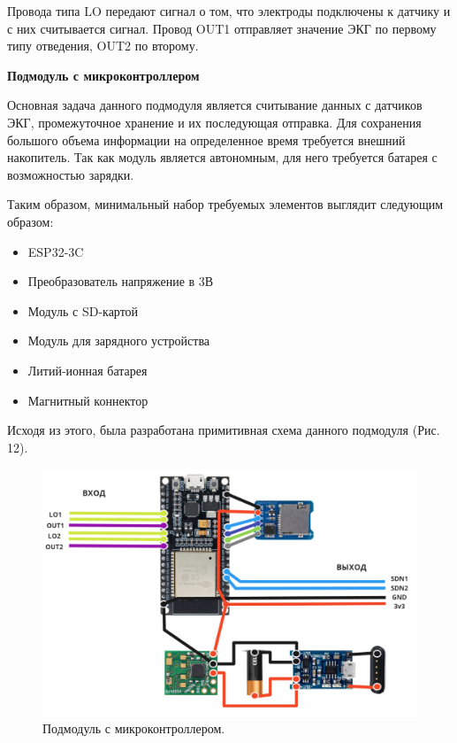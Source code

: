 \documentclass[12pt, russian]{extarticle}
\begin{document}
\begin{spacing}{1.5}
Провода типа LO передают сигнал о том, что электроды подключены к датчику и с них считывается сигнал. Провод OUT1 отправляет значение ЭКГ по первому типу отведения, OUT2 по второму.

\par\textbf{Подмодуль с микроконтроллером}

Основная задача данного подмодуля является считывание данных с датчиков ЭКГ, промежуточное хранение и их последующая отправка. Для сохранения большого объема информации на определенное время требуется внешний накопитель. Так как модуль является автономным, для него требуется батарея с возможностью зарядки.

Таким образом, минимальный набор требуемых элементов выглядит следующим образом:

\begin{itemize}
    \item ESP32-3C
    \item Преобразователь напряжение в 3В
    \item Модуль с SD-картой
    \item Модуль для зарядного устройства
    \item Литий-ионная батарея
    \item Магнитный коннектор
\end{itemize}

Исходя из этого, была разработана примитивная схема данного подмодуля (Рис. 12).
\newpage

\begin{figure}[htbp]
\centering
\includegraphics[scale=0.48]{resources/2.png}
\caption{Подмодуль с микроконтроллером.}
\label{fig:my_label}
\end{figure}


\end{spacing}
\end{document}
